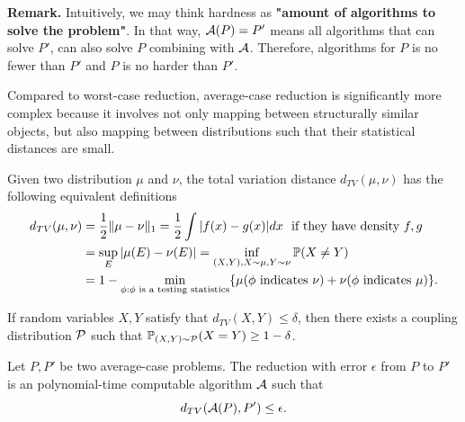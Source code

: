\textbf{Remark.} Intuitively, we may think hardness as \textbf{"amount of algorithms to solve the problem"}. In that way, $\mathcal{A}(P) = P'$ means all algorithms that can solve $P'$, can also solve $P$ combining with $\mathcal{A}$. Therefore, algorithms for $P$ is no fewer than $P'$ and $P$ is no harder than $P'$.

Compared to worst-case reduction, average-case reduction is significantly more complex because it involves not only mapping between structurally similar objects, but also mapping between distributions such that their statistical distances are small.

\begin{lem}
    \label{tv_def}
    Given two distribution $\mu$ and $\nu$, the total variation distance $d_{TV}(\mu,\nu)$ has the following equivalent definitions
    \begin{align*}
        d_{TV}(\mu,\nu) &= \frac{1}{2}\|\mu-\nu\|_1 
                        = \frac{1}{2}\int |f(x)-g(x)|dx ~~\text{if they have density $f,g$}\\
                        &= \sup_{E}|\mu(E) - \nu(E)| 
                        = \inf_{(X,Y),X\sim\mu,Y\sim\nu}\mathbb{P}(X\neq Y)\\
                        &=1- \min_{\phi:\phi\text{ is a testing statistics}}\{\mu(\phi\text{ indicates }\nu)+\nu(\phi\text{ indicates }\mu)\}.
    \end{align*}
\end{lem}

\begin{lem}
    \label{tv_coup}
    If random variables $X,Y$ satisfy that $d_{TV}(X,Y)\le\delta$, then there exists a coupling distribution $\mathcal{P}$ such that $\mathbb{P}_{(X,Y)\sim\mathcal{P}}(X=Y)\ge 1-\delta$.
\end{lem}

\begin{defn}[Reduction]
    Let $P, P'$ be two average-case problems. The reduction with error $\epsilon$ from $P$ to $P'$ is an polynomial-time computable algorithm $\mathcal{A}$ such that
    \[
        d_{TV}(\mathcal{A}(P), P')\le\epsilon.
    \]
\end{defn}

